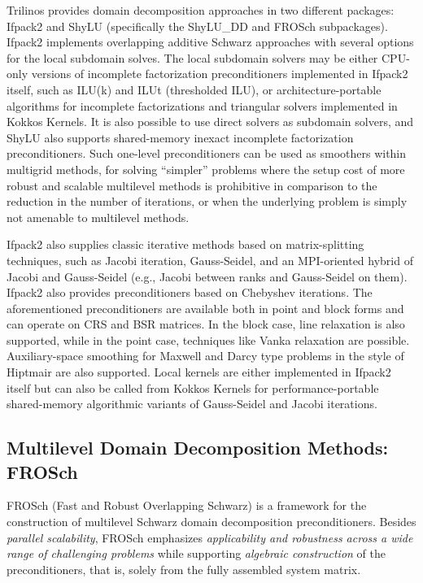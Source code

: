 Trilinos provides domain decomposition approaches in two different
packages: Ifpack2 and ShyLU (specifically the ShyLU\_DD and FROSch
subpackages). Ifpack2 implements overlapping additive Schwarz
approaches with several options for the local subdomain solves. The
local subdomain solvers may be either CPU-only versions of incomplete
factorization preconditioners implemented in Ifpack2 itself, such as
ILU(k) and ILUt (thresholded ILU), or architecture-portable algorithms
for incomplete factorizations and triangular solvers implemented in
Kokkos Kernels. It is also possible to use direct solvers as subdomain
solvers, and ShyLU also supports shared-memory inexact
incomplete factorization preconditioners.
Such one-level preconditioners can be used as smoothers within multigrid
methods, for solving ``simpler'' problems where the setup cost of more robust and scalable multilevel methods is prohibitive in comparison to the reduction in the number of iterations, or when the underlying problem is simply not amenable to multilevel methods.

Ifpack2 also supplies classic iterative methods based on matrix-splitting techniques, such as Jacobi iteration, Gauss-Seidel, and an MPI-oriented hybrid of Jacobi and Gauss-Seidel (e.g., Jacobi between ranks and Gauss-Seidel on them). Ifpack2 also provides preconditioners
based on Chebyshev iterations. The aforementioned preconditioners are available both in point and block
forms and can operate on CRS and BSR matrices. In the block case,
line relaxation is also supported, while in the point case, techniques
like Vanka relaxation \cite{Vanka1986} are possible.  Auxiliary-space
smoothing for Maxwell and Darcy type problems in the style of
Hiptmair \cite{Hiptmair1997} are also supported.
Local kernels are either implemented in Ifpack2 itself
but can also be called from Kokkos Kernels for performance\hyp{}portable shared-memory algorithmic variants of Gauss-Seidel and Jacobi iterations.

\subsection{Multilevel Domain Decomposition Methods: FROSch}
\label{ssec:frosch}

FROSch (Fast and Robust Overlapping Schwarz) is a framework for the construction of multilevel Schwarz domain decomposition preconditioners. Besides \emph{parallel scalability}, FROSch emphasizes \emph{applicability and robustness across a wide range of challenging problems} while supporting \emph{algebraic construction} of the preconditioners, that is, solely from the fully assembled system matrix.

